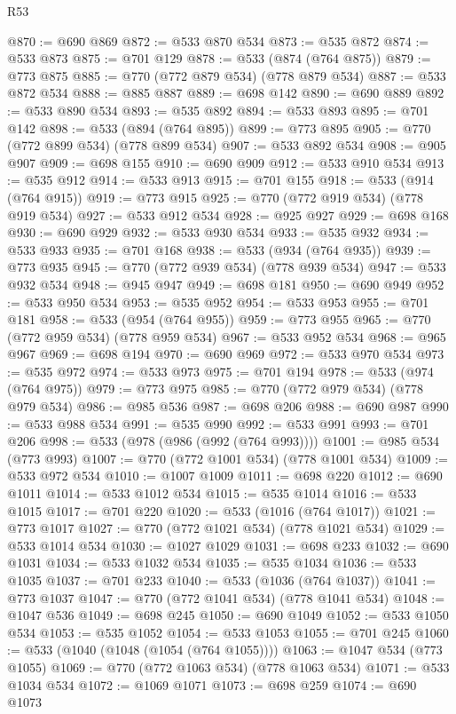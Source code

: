 \begin{lexlean}{R53}
\begin{coremodule}
@870 := @690 @869
@872 := @533 @870 @534
@873 := @535 @872
@874 := @533 @873
@875 := @701 @129
@878 := @533 (@874 (@764 @875))
@879 := @773 @875
@885 := @770 (@772 @879 @534) (@778 @879 @534)
@887 := @533 @872 @534
@888 := @885 @887
@889 := @698 @142
@890 := @690 @889
@892 := @533 @890 @534
@893 := @535 @892
@894 := @533 @893
@895 := @701 @142
@898 := @533 (@894 (@764 @895))
@899 := @773 @895
@905 := @770 (@772 @899 @534) (@778 @899 @534)
@907 := @533 @892 @534
@908 := @905 @907
@909 := @698 @155
@910 := @690 @909
@912 := @533 @910 @534
@913 := @535 @912
@914 := @533 @913
@915 := @701 @155
@918 := @533 (@914 (@764 @915))
@919 := @773 @915
@925 := @770 (@772 @919 @534) (@778 @919 @534)
@927 := @533 @912 @534
@928 := @925 @927
@929 := @698 @168
@930 := @690 @929
@932 := @533 @930 @534
@933 := @535 @932
@934 := @533 @933
@935 := @701 @168
@938 := @533 (@934 (@764 @935))
@939 := @773 @935
@945 := @770 (@772 @939 @534) (@778 @939 @534)
@947 := @533 @932 @534
@948 := @945 @947
@949 := @698 @181
@950 := @690 @949
@952 := @533 @950 @534
@953 := @535 @952
@954 := @533 @953
@955 := @701 @181
@958 := @533 (@954 (@764 @955))
@959 := @773 @955
@965 := @770 (@772 @959 @534) (@778 @959 @534)
@967 := @533 @952 @534
@968 := @965 @967
@969 := @698 @194
@970 := @690 @969
@972 := @533 @970 @534
@973 := @535 @972
@974 := @533 @973
@975 := @701 @194
@978 := @533 (@974 (@764 @975))
@979 := @773 @975
@985 := @770 (@772 @979 @534) (@778 @979 @534)
@986 := @985 @536
@987 := @698 @206
@988 := @690 @987
@990 := @533 @988 @534
@991 := @535 @990
@992 := @533 @991
@993 := @701 @206
@998 := @533 (@978 (@986 (@992 (@764 @993))))
@1001 := @985 @534 (@773 @993)
@1007 := @770 (@772 @1001 @534) (@778 @1001 @534)
@1009 := @533 @972 @534
@1010 := @1007 @1009
@1011 := @698 @220
@1012 := @690 @1011
@1014 := @533 @1012 @534
@1015 := @535 @1014
@1016 := @533 @1015
@1017 := @701 @220
@1020 := @533 (@1016 (@764 @1017))
@1021 := @773 @1017
@1027 := @770 (@772 @1021 @534) (@778 @1021 @534)
@1029 := @533 @1014 @534
@1030 := @1027 @1029
@1031 := @698 @233
@1032 := @690 @1031
@1034 := @533 @1032 @534
@1035 := @535 @1034
@1036 := @533 @1035
@1037 := @701 @233
@1040 := @533 (@1036 (@764 @1037))
@1041 := @773 @1037
@1047 := @770 (@772 @1041 @534) (@778 @1041 @534)
@1048 := @1047 @536
@1049 := @698 @245
@1050 := @690 @1049
@1052 := @533 @1050 @534
@1053 := @535 @1052
@1054 := @533 @1053
@1055 := @701 @245
@1060 := @533 (@1040 (@1048 (@1054 (@764 @1055))))
@1063 := @1047 @534 (@773 @1055)
@1069 := @770 (@772 @1063 @534) (@778 @1063 @534)
@1071 := @533 @1034 @534
@1072 := @1069 @1071
@1073 := @698 @259
@1074 := @690 @1073

\end{coremodule}
\end{lexlean}
